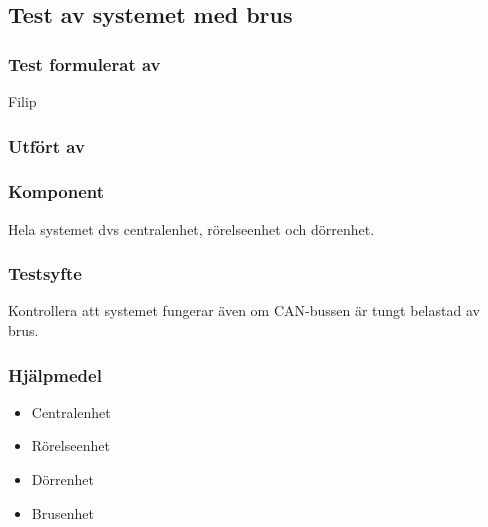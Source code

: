 \clearpage
\subsection{Test av systemet med brus}
\label{test:brusTest}

\setlength{\columnsep}{1cm}




\begin{multicols}{2}
\subsubsection*{Test formulerat av}
Filip

\subsubsection*{Utfört av}



\end{multicols}
\subsubsection*{Komponent}
Hela systemet dvs centralenhet, rörelseenhet och dörrenhet.


\subsubsection*{Testsyfte}
Kontrollera att systemet fungerar även om CAN-bussen är tungt belastad av brus.


\subsubsection*{Hjälpmedel}
\begin{itemize}
	\item Centralenhet
	\item Rörelseenhet
	\item Dörrenhet
	\item Brusenhet
\end{itemize}



